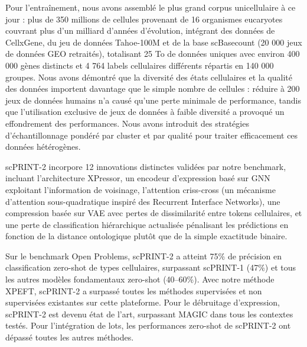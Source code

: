 Pour l'entraînement, nous avons assemblé le plus grand corpus unicellulaire à ce jour : plus de 350 millions de cellules provenant de 16 organismes eucaryotes couvrant plus d'un milliard d'années d'évolution, intégrant des données de CellxGene, du jeu de données Tahoe-100M et de la base scBasecount (20 000 jeux de données GEO retraités), totalisant 25 To de données uniques avec environ 400 000 gènes distincts et 4 764 labels cellulaires différents répartis en 140 000 groupes. Nous avons démontré que la diversité des états cellulaires et la qualité des données importent davantage que le simple nombre de cellules : réduire à 200 jeux de données humains n'a causé qu'une perte minimale de performance, tandis que l'utilisation exclusive de jeux de données à faible diversité a provoqué un effondrement des performances. Nous avons introduit des stratégies d'échantillonnage pondéré par cluster et par qualité pour traiter efficacement ces données hétérogènes.

scPRINT-2 incorpore 12 innovations distinctes validées par notre benchmark, incluant l'architecture XPressor, un encodeur d'expression basé sur GNN exploitant l'information de voisinage, l'attention criss-cross (un mécanisme d'attention sous-quadratique inspiré des Recurrent Interface Networks), une compression basée sur VAE avec pertes de dissimilarité entre tokens cellulaires, et une perte de classification hiérarchique actualisée pénalisant les prédictions en fonction de la distance ontologique plutôt que de la simple exactitude binaire.

Sur le benchmark Open Problems, scPRINT-2 a atteint 75\% de précision en classification zero-shot de types cellulaires, surpassant scPRINT-1 (47\%) et tous les autres modèles fondamentaux zero-shot (40–60\%). Avec notre méthode XPEFT, scPRINT-2 a surpassé toutes les méthodes supervisées et non supervisées existantes sur cette plateforme. Pour le débruitage d'expression, scPRINT-2 est devenu état de l'art, surpassant MAGIC dans tous les contextes testés. Pour l'intégration de lots, les performances zero-shot de scPRINT-2 ont dépassé toutes les autres méthodes.

